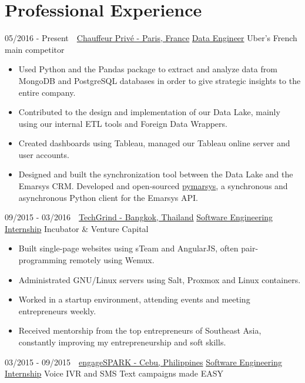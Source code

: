 \documentclass[]{friggeri-cv}
\begin{document}
\section{Professional Experience}
\begin{entrylist}
  \entry
    {05/2016 - Present\, \,}
    {\href{https://chauffeur-prive.com}{Chauffeur Privé - Paris, France}}
    {\href{https://chauffeur-prive.com}{Data Engineer}}
    {Uber's French main competitor}
\end{entrylist}
\begin{itemize}
    \item Used Python and the Pandas package to extract and analyze data from MongoDB and PostgreSQL databases in order to give strategic insights to the entire company.  
    \item Contributed to the design and implementation of our Data Lake, mainly using our internal ETL tools and Foreign Data Wrappers. 
    \item Created dashboards using Tableau, managed our Tableau online server and user accounts.
    \item Designed and built the synchronization tool between the Data Lake and the Emarsys CRM. Developed and open-sourced \href{https://github.com/transcovo/pymarsy}{pymarsys}, a synchronous and asynchronous Python client for the Emarsys API. 
\end{itemize}
\begin{entrylist}
  \entry
    {09/2015 - 03/2016\, \,}
    {\href{http://techgrind.asia/}{TechGrind - Bangkok, Thailand}}
    {\href{http://techgrind.asia/}{Software Engineering Internship}}
    {Incubator \& Venture Capital}
\end{entrylist}
\begin{itemize}
  \item Built single-page websites using sTeam and AngularJS, often pair-programming remotely using Wemux. 
  \item Administrated GNU/Linux servers using Salt, Proxmox and Linux containers. 
  \item Worked in a startup environment, attending events and meeting entrepreneurs weekly.
  \item Received mentorship from the top entrepreneurs of Southeast Asia, constantly improving my entrepreneurship and soft skills.
\end{itemize}
\begin{entrylist}
  \entry
    {03/2015 - 09/2015\, \,}
    {\href{https://www.engagespark.com/}{engageSPARK - Cebu, Philippines}}
    {\href{https://www.engagespark.com/}{Software Engineering Internship}}
    {Voice IVR and SMS Text campaigns made EASY}
\end{entrylist}
\end{document}
